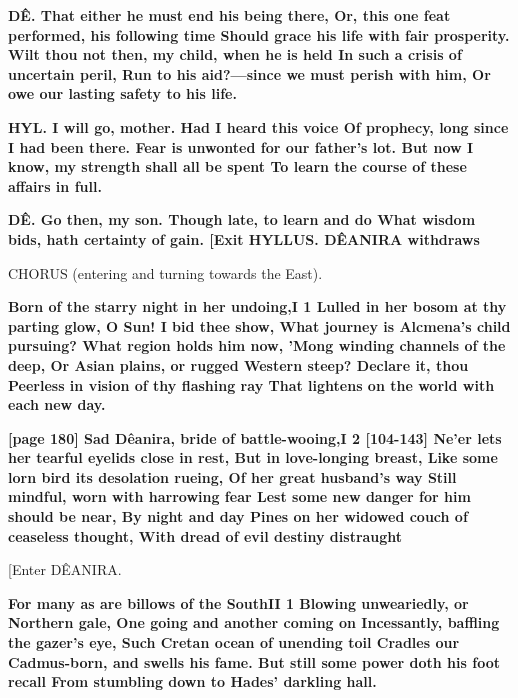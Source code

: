 \documentclass[11pt,letter]{book}
\begin{document}
\par \textbf{DÊ. That either he must end his being there, Or, this one feat performed, his following time Should grace his life with fair prosperity. Wilt thou not then, my child, when he is held In such a crisis of uncertain peril, Run to his aid?—since we must perish with him, Or owe our lasting safety to his life.}
\par 

\par \textbf{HYL. I will go, mother. Had I heard this voice Of prophecy, long since I had been there. Fear is unwonted for our father’s lot. But now I know, my strength shall all be spent To learn the course of these affairs in full.}
\par 

\par \textbf{DÊ. Go then, my son. Though late, to learn and do What wisdom bids, hath certainty of gain. [Exit HYLLUS. DÊANIRA withdraws}
\par 

\par  CHORUS (entering and turning towards the East).

\par \textbf{Born of the starry night in her undoing,I 1 Lulled in her bosom at thy parting glow, O Sun! I bid thee show, What journey is Alcmena’s child pursuing? What region holds him now, ’Mong winding channels of the deep, Or Asian plains, or rugged Western steep? Declare it, thou Peerless in vision of thy flashing ray That lightens on the world with each new day.}
\par 

\par \textbf{[page 180] Sad Dêanira, bride of battle-wooing,I 2 [104-143] Ne’er lets her tearful eyelids close in rest, But in love-longing breast, Like some lorn bird its desolation rueing, Of her great husband’s way Still mindful, worn with harrowing fear Lest some new danger for him should be near, By night and day Pines on her widowed couch of ceaseless thought, With dread of evil destiny distraught}
\par  [Enter DÊANIRA.

\par \textbf{For many as are billows of the SouthII 1 Blowing unweariedly, or Northern gale, One going and another coming on Incessantly, baffling the gazer’s eye, Such Cretan ocean of unending toil Cradles our Cadmus-born, and swells his fame. But still some power doth his foot recall From stumbling down to Hades’ darkling hall.}
\par 
\end{document}
